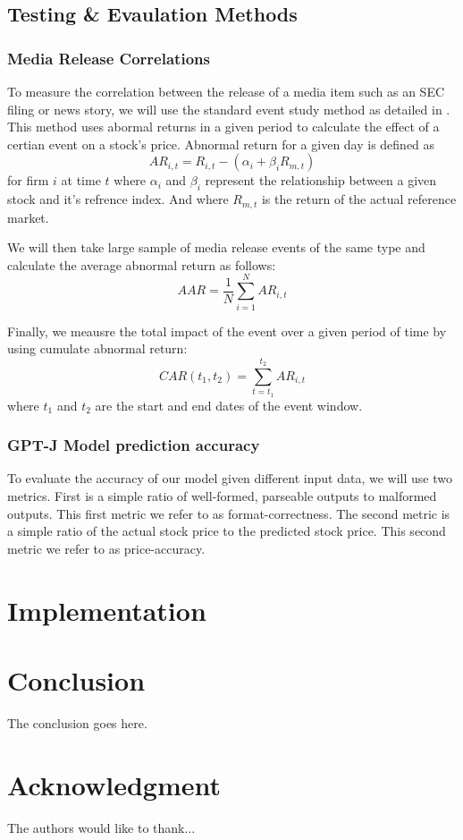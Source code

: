 \documentclass[conference]{IEEEtran}
\begin{document}
\subsection{Testing \& Evaulation Methods}
\subsubsection{Media Release Correlations}
To measure the correlation between the release of a media item such as an SEC filing or news story, we will use the standard event study method as detailed in \cite{Neuhierl2010}. This method uses abormal returns in a given period to calculate the effect of a certian event on a stock's price. Abnormal return for a given day is defined as 
\begin{equation}
	AR_{i,t}=R_{i,t}-(\alpha_i+\beta_i R_{m,t})
\end{equation}
for firm $i$ at time $t$ where $\alpha_i$ and $\beta_i$ represent the relationship between a given stock and it's refrence index. And where $R_{m,t}$ is the return of the actual reference market.

We will then take large sample of media release events of the same type and calculate the average abnormal return as follows:
\begin{equation}
	AAR= \frac{1}{N} \sum\limits_{i=1}^{N}AR_{i,t}
\end{equation}

Finally, we meausre the total impact of the event over a given period of time by using cumulate abnormal return:
\begin{equation}
	CAR(t_1,t_2)=\sum\limits_{t=t_1}^{t_2} AR_{i,t} 
\end{equation}
where $t_1$ and $t_2$ are the start and end dates of the event window.
\subsubsection{GPT-J Model prediction accuracy}
To evaluate the accuracy of our model given different input data, we will use two metrics. First is a simple ratio of well-formed, parseable outputs to malformed outputs. This first metric we refer to as format-correctness. The second metric is a simple ratio of the actual stock price to the predicted stock price. This second metric we refer to as price-accuracy.
\section{Implementation}
\section{Conclusion}
The conclusion goes here.

\section*{Acknowledgment}
The authors would like to thank... 




\end{document}
